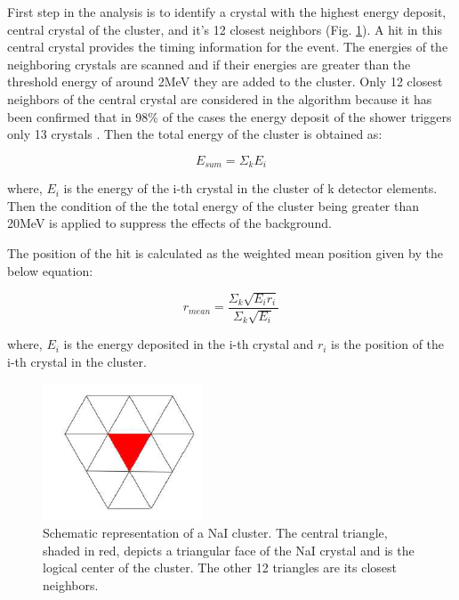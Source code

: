 \indent First step in the analysis is to identify a crystal with the highest energy deposit, central crystal of the cluster, and it's 12 closest neighbors (Fig. \ref{cbcluster}). A hit in this central crystal provides the timing information for the event. The energies of the neighboring crystals are scanned and if their energies are greater than the threshold energy of around 2MeV they are added to the cluster. Only 12 closest neighbors of the central crystal are considered in the algorithm because it has been confirmed that in 98\% of the cases the energy deposit of the shower triggers only 13 crystals \cite{claire}. Then the total energy of the cluster is obtained as:

\begin{equation}
E_{sum}=\Sigma_{k}E_{i}
\end{equation}

where, $E_{i}$ is the energy of the i-th crystal in the cluster of k detector elements. Then the condition of the the total energy of the cluster being greater than 20MeV  is applied to suppress the effects of the background.

\indent The position of the hit is calculated as the weighted mean position given by the below equation:

\begin{equation}
r_{mean}=\frac{\Sigma_{k}\sqrt{E_{i}r_{i}}}{\Sigma_{k}\sqrt{E_{i}}}
\end{equation}

where, $E_{i}$ is the energy deposited in the i-th crystal and $r_{i}$ is the position of the i-th crystal in the cluster.

\begin{figure}[H]
\begin{center}
\includegraphics[scale=0.55]{pictures/png/cbcluster.png}
\caption{Schematic representation of a NaI cluster. The central triangle, shaded in red, depicts a triangular face of the NaI crystal and is the logical center of the cluster. The other 12 triangles are its closest neighbors.}
\label{cbcluster}
\end{center}
\end{figure}

